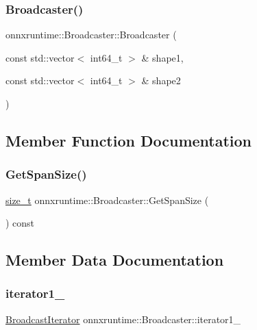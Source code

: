 \subsubsection{\texorpdfstring{Broadcaster()}{Broadcaster()}}
{\footnotesize\ttfamily onnxruntime\+::\+Broadcaster\+::\+Broadcaster (\begin{DoxyParamCaption}\item[{const std\+::vector$<$ int64\+\_\+t $>$ \&}]{shape1,  }\item[{const std\+::vector$<$ int64\+\_\+t $>$ \&}]{shape2 }\end{DoxyParamCaption})\hspace{0.3cm}{\ttfamily [inline]}}



\subsection{Member Function Documentation}
\mbox{\label{structonnxruntime_1_1Broadcaster_ae6594a091b038210b658727b109ec49e}} 
\subsubsection{\texorpdfstring{Get\+Span\+Size()}{GetSpanSize()}}
{\footnotesize\ttfamily \mbox{\hyperlink{mlasi_8h_a503efbc1c6e50825320ad909366b78ab}{size\+\_\+t}} onnxruntime\+::\+Broadcaster\+::\+Get\+Span\+Size (\begin{DoxyParamCaption}{ }\end{DoxyParamCaption}) const\hspace{0.3cm}{\ttfamily [inline]}}



\subsection{Member Data Documentation}
\mbox{\label{structonnxruntime_1_1Broadcaster_a82eac71829dfb28f71a7de305c1f7394}} 
\subsubsection{\texorpdfstring{iterator1\+\_\+}{iterator1\_}}
{\footnotesize\ttfamily \mbox{\hyperlink{structonnxruntime_1_1BroadcastIterator}{Broadcast\+Iterator}} onnxruntime\+::\+Broadcaster\+::iterator1\+\_\+}

